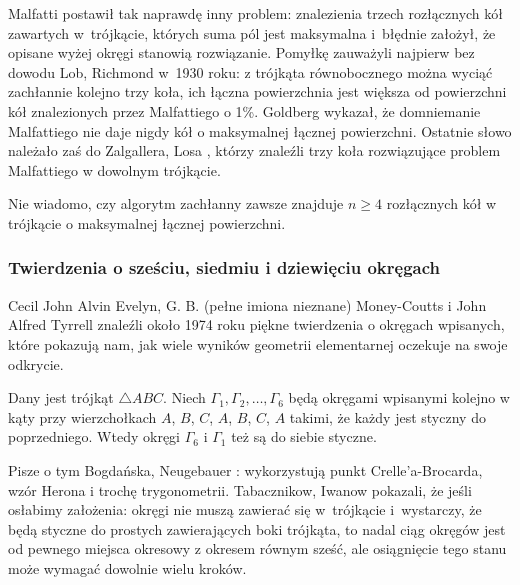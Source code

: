 Malfatti postawił tak naprawdę inny problem: znalezienia trzech rozłącznych kół zawartych w~trójkącie, których suma pól jest maksymalna i~błędnie założył, że opisane wyżej okręgi stanowią rozwiązanie.
Pomyłkę zauważyli najpierw bez dowodu Lob, Richmond \cite{lob_richmond_1930} w~1930 roku: z trójkąta równobocznego można wyciąć zachłannie kolejno trzy koła, ich łączna powierzchnia jest większa od powierzchni kół znalezionych przez Malfattiego o 1\%.
%
%
Goldberg \cite{goldberg_1967} wykazał, że domniemanie Malfattiego nie daje nigdy kół o maksymalnej łącznej powierzchni.
Ostatnie słowo należało zaś do Zalgallera, Losa \cite{zalgaller_los_1992}, którzy znaleźli trzy koła rozwiązujące problem Malfattiego w dowolnym trójkącie.
%
%

Nie wiadomo, czy algorytm zachłanny zawsze znajduje $n \ge 4$ rozłącznych kół w trójkącie o maksymalnej łącznej powierzchni.

\subsubsection{Twierdzenia o sześciu, siedmiu i dziewięciu okręgach}
Cecil John Alvin Evelyn, G. B. (pełne imiona nieznane) Money-Coutts i John Alfred Tyrrell znaleźli około 1974 roku piękne twierdzenia o okręgach wpisanych, które pokazują nam, jak wiele wyników geometrii elementarnej oczekuje na swoje odkrycie.

\begin{proposition}
	Dany jest trójkąt $\triangle ABC$.
	Niech $\Gamma_1, \Gamma_2, \ldots, \Gamma_6$ będą okręgami wpisanymi kolejno w kąty przy wierzchołkach $A$, $B$, $C$, $A$, $B$, $C$, $A$ takimi, że każdy jest styczny do poprzedniego.
	Wtedy okręgi $\Gamma_6$ i $\Gamma_1$ też są do siebie styczne.
\end{proposition}

Pisze o tym Bogdańska, Neugebauer \cite[s. 101]{neugebauer_2018}: wykorzystują punkt Crelle'a-Brocarda, wzór Herona i trochę trygonometrii.
Tabacznikow, Iwanow \cite{ivanov_tabachnikov_2016} pokazali, że jeśli osłabimy założenia: okręgi nie muszą zawierać się w~trójkącie i~wystarczy, że będą styczne do prostych zawierających boki trójkąta, to nadal ciąg okręgów jest od pewnego miejsca okresowy z okresem równym sześć, ale osiągnięcie tego stanu może wymagać dowolnie wielu kroków.
%
%

